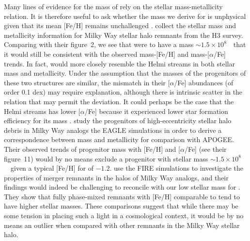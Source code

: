 Many lines of evidence for the mass of \gse rely on the stellar mass-metallicity relation. It is therefore useful to ask whether the mass we derive for \gse is unphysical given that its mean [Fe/H] remains unchallenged \parencite[cf. our Figure~\ref{fig:selection_abundances} with ][]{myeong19,monty20,hasselquist21,horta23a}. \textcite{naidu22} collect the stellar mass and metallicity information for Milky Way stellar halo remnants from the H3 survey. Comparing with their figure~2, we see that were \gse to have a mass $\sim 1.5\times10^{8}$~\Msun\ that it would still be consistent with the observed mass-[Fe/H] and mass-[$\alpha$/Fe] trends. In fact, \gse would more closely resemble the Helmi streams \parencite{helmi99} in both stellar mass and metallicity. Under the assumption that the masses of the progenitors of these two structures are similar, the mismatch in their [$\alpha$/Fe] abundances (of order 0.1 dex) may require explanation, although there is intrinsic scatter in the relation that may permit the deviation. It could perhaps be the case that the Helmi streams has lower [$\alpha$/Fe] because it experienced lower star formation efficiency for its mass \parencite[e.g.][]{matsuno22}. \textcite{mackereth19a} study the progenitors of high-eccentricity stellar halo debris in Milky Way analogs the EAGLE simulations in order to derive a correspondence between mass and metallicity for comparison with APOGEE. Their observed trends of progenitor mass with [Fe/H] and [$\alpha$/Fe] (see their figure~11) would by no means exclude a progenitor with stellar mass $\sim 1.5\times10^{8}$~\Msun\ given a typical [Fe/H] for \gse of $-1.2$. \textcite{horta23b} use the FIRE simulations to investigate the properties of merger remnants in the halos of Milky Way analogs, and their findings would indeed be challenging to reconcile with our low stellar mass for \gse. They show that fully phase-mixed remnants with [Fe/H] comparable to \gse tend to have higher stellar masses. These comparisons suggest that while there may be some tension in placing such a light \gse in a cosmological context, it would be by no means an outlier when compared with other remnants in the Milky Way stellar halo.

